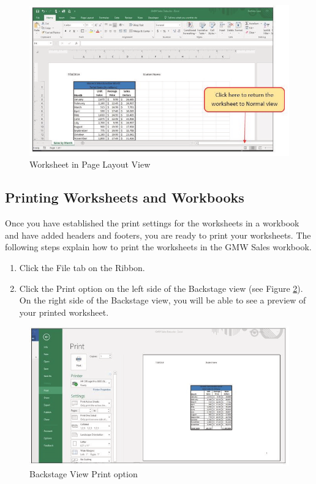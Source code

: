 \begin{figure}[H]
	\centering
	\includegraphics[width=\maxwidth{.95\linewidth}]{gfx/ch01_fig51}
	\caption{Worksheet in Page Layout View}
	\label{01:fig51}
\end{figure}

\subsection{Printing Worksheets and Workbooks}

Once you have established the print settings for the worksheets in a workbook and have added headers and footers, you are ready to print your worksheets. The following steps explain how to print the worksheets in the GMW Sales workbook.

\begin{enumerate}
	\item Click the File tab on the Ribbon.
	\item Click the Print option on the left side of the Backstage view (see Figure \ref{01:fig52}). On the right side of the Backstage view, you will be able to see a preview of your printed worksheet.
\end{enumerate}

\begin{figure}[H]
	\centering
	\includegraphics[width=\maxwidth{.95\linewidth}]{gfx/ch01_fig52}
	\caption{Backstage View Print option}
	\label{01:fig52}
\end{figure}

